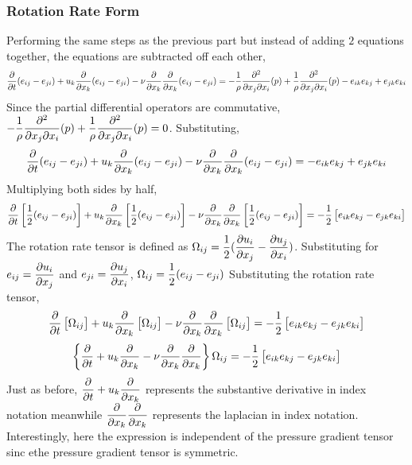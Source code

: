 \documentclass[a4paper, 12pt]{report}
\begin{document}
\begin{center}
\subsubsection{Rotation Rate Form}
\begin{comment}
\end{comment}
Performing the same steps as the previous part but instead of adding $2$ equations together, the equations are subtracted off each other,
$$\frac{\partial}{\partial t}(e_{ij}-e_{ji}) + u_k\frac{\partial }{\partial x_k}(e_{ij}-e_{ji}) - \nu\frac{\partial}{\partial x_k}\frac{\partial}{\partial x_k}(e_{ij}-e_{ji}) = -\frac{1}{\rho}\frac{\partial^2}{\partial x_j\partial x_i}(p) + \frac{1}{\rho}\frac{\partial^2}{\partial x_j\partial x_i}(p) - e_{ik}e_{kj} + e_{jk}e_{ki}$$
Since the partial differential operators are commutative, $\displaystyle{ -\frac{1}{\rho}\frac{\partial^2}{\partial x_j\partial x_i}(p) + \frac{1}{\rho}\frac{\partial^2}{\partial x_j\partial x_i}(p)=0}$. Substituting,
$$\frac{\partial}{\partial t}(e_{ij}-e_{ji}) + u_k\frac{\partial }{\partial x_k}(e_{ij}-e_{ji}) - \nu\frac{\partial}{\partial x_k}\frac{\partial}{\partial x_k}(e_{ij}-e_{ji}) = - e_{ik}e_{kj} + e_{jk}e_{ki}$$
Multiplying both sides by half,
$$\frac{\partial}{\partial t}\left[\frac{1}{2}(e_{ij}-e_{ji})\right] + u_k\frac{\partial }{\partial x_k}\left[\frac{1}{2}(e_{ij}-e_{ji})\right] - \nu\frac{\partial}{\partial x_k}\frac{\partial}{\partial x_k}\left[\frac{1}{2}(e_{ij}-e_{ji})\right] = - \frac{1}{2}\left[e_{ik}e_{kj} - e_{jk}e_{ki}\right]$$
The rotation rate tensor is defined as $\displaystyle{\Omega_{ij} = \frac{1}{2}(\frac{\partial u_i}{\partial x_j}-\frac{\partial u_j}{\partial x_i})}$. Substituting for $\displaystyle{e_{ij} = \frac{\partial u_i}{\partial x_j}}$ and $\displaystyle{e_{ji} = \frac{\partial u_j}{\partial x_i}}$, $\displaystyle{\Omega_{ij} = \frac{1}{2}(e_{ij}-e_{ji})}$
Substituting the rotation rate tensor,
$$\frac{\partial}{\partial t}\left[\Omega_{ij}\right] + u_k\frac{\partial }{\partial x_k}\left[\Omega_{ij}\right] - \nu\frac{\partial}{\partial x_k}\frac{\partial}{\partial x_k}\left[\Omega_{ij}\right] = - \frac{1}{2}\left[e_{ik}e_{kj} - e_{jk}e_{ki}\right]$$
$$\left\{\frac{\partial}{\partial t} + u_k\frac{\partial }{\partial x_k} - \nu\frac{\partial}{\partial x_k}\frac{\partial}{\partial x_k}\right\}\Omega_{ij} = - \frac{1}{2}\left[e_{ik}e_{kj} - e_{jk}e_{ki}\right]$$
Just as before, $\displaystyle{\frac{\partial}{\partial t} + u_k\frac{\partial}{\partial x_k}}$ represents the substantive derivative in index notation meanwhile $\displaystyle{\frac{\partial}{\partial x_k}\frac{\partial}{\partial x_k}}$ represents the laplacian in index notation. Interestingly, here the expression is independent of the pressure gradient tensor sinc ethe pressure gradient tensor is symmetric.
\end{center}
\end{document}
